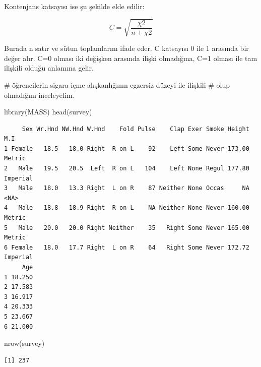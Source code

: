 \documentclass[
  letterpaper,
  DIV=11,
  numbers=noendperiod]{scrreprt}
\newenvironment{Shaded}{\begin{snugshade}}{\end{snugshade}}
\newcommand{\CommentTok}[1]{\textcolor[rgb]{0.37,0.37,0.37}{#1}}
\newcommand{\FunctionTok}[1]{\textcolor[rgb]{0.28,0.35,0.67}{#1}}
\newcommand{\NormalTok}[1]{\textcolor[rgb]{0.00,0.23,0.31}{#1}}
\newcommand{\OtherTok}[1]{\textcolor[rgb]{0.00,0.23,0.31}{#1}}
\newcommand{\SpecialCharTok}[1]{\textcolor[rgb]{0.37,0.37,0.37}{#1}}
\begin{document}
Kontenjans katsayısı ise şu şekilde elde edilir:

\[ C=\sqrt{\frac{\chi2}{n+\chi2}} \]

Burada n satır ve sütun toplamlarını ifade eder. C katsayısı 0 ile 1
arasında bir değer alır. C=0 olması iki değişken arasında ilişki
olmadığına, C=1 olması ile tam ilişkili olduğu anlamına gelir.

\begin{Shaded}
\begin{Highlighting}[]
\CommentTok{\# öğrencilerin sigara içme alışkanlığının egzersiz düzeyi ile ilişkili}
\CommentTok{\# olup olmadığını inceleyelim.}

\FunctionTok{library}\NormalTok{(MASS)}
\FunctionTok{head}\NormalTok{(survey)}
\end{Highlighting}
\end{Shaded}

\begin{verbatim}
     Sex Wr.Hnd NW.Hnd W.Hnd    Fold Pulse    Clap Exer Smoke Height      M.I
1 Female   18.5   18.0 Right  R on L    92    Left Some Never 173.00   Metric
2   Male   19.5   20.5  Left  R on L   104    Left None Regul 177.80 Imperial
3   Male   18.0   13.3 Right  L on R    87 Neither None Occas     NA     <NA>
4   Male   18.8   18.9 Right  R on L    NA Neither None Never 160.00   Metric
5   Male   20.0   20.0 Right Neither    35   Right Some Never 165.00   Metric
6 Female   18.0   17.7 Right  L on R    64   Right Some Never 172.72 Imperial
     Age
1 18.250
2 17.583
3 16.917
4 20.333
5 23.667
6 21.000
\end{verbatim}

\begin{Shaded}
\begin{Highlighting}[]
\FunctionTok{nrow}\NormalTok{(survey)}
\end{Highlighting}
\end{Shaded}

\begin{verbatim}
[1] 237
\end{verbatim}

\begin{Shaded}
\end{Shaded}
\end{document}
